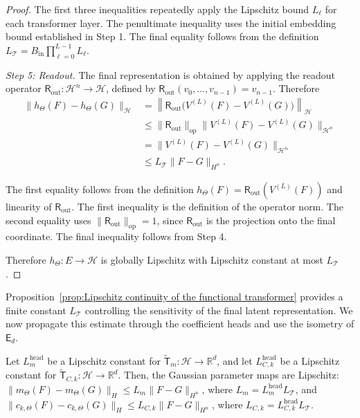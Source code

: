\begin{proof}
The first three inequalities repeatedly apply the Lipschitz bound \(L_\ell\) for each transformer layer. The penultimate inequality uses the initial embedding bound established in Step 1. The final equality follows from the definition \(L_{\mathcal T}=B_{\mathrm{in}}\prod_{\ell=0}^{L-1}L_\ell\).

\textit{Step 5: Readout.} The final representation is obtained by applying the readout operator \(\mathsf R_{\mathrm{out}}:\mathcal H^n\to\mathcal H\), defined by \(\mathsf R_{\mathrm{out}}(v_0,\ldots,v_{n-1})=v_{n-1}\). Therefore
\[
\begin{aligned}
\|h_\Theta(F)-h_\Theta(G)\|_{\mathcal H}
&=
\left\|
\mathsf R_{\mathrm{out}}\bigl(V^{(L)}(F)-V^{(L)}(G)\bigr)
\right\|_{\mathcal H}\\
&\leqslant
\|\mathsf R_{\mathrm{out}}\|_{\mathrm{op}}
\|V^{(L)}(F)-V^{(L)}(G)\|_{\mathcal H^n}\\
&=
\|V^{(L)}(F)-V^{(L)}(G)\|_{\mathcal H^n}\\
&\leqslant
L_{\mathcal T}\|F-G\|_{H^n}.
\end{aligned}
\]

The first equality follows from the definition \(h_\Theta(F)=\mathsf R_{\mathrm{out}}(V^{(L)}(F))\) and linearity of \(\mathsf R_{\mathrm{out}}\). The first inequality is the definition of the operator norm. The second equality uses \(\|\mathsf R_{\mathrm{out}}\|_{\mathrm{op}}=1\), since \(\mathsf R_{\mathrm{out}}\) is the projection onto the final coordinate. The final inequality follows from Step 4.

Therefore \(h_\Theta:E\to\mathcal H\) is globally Lipschitz with Lipschitz constant at most \(L_{\mathcal T}\).
\end{proof}

Proposition~\ref{prop:Lipschitz continuity of the functional transformer} provides a finite constant \(L_{\mathcal T}\) controlling the sensitivity of the final latent representation. We now propagate this estimate through the coefficient heads and use the isometry of \(\mathsf E_d\).

\begin{corollary}
\label{cor:Lipschitz continuity of the Gaussian parameter maps}
Let \(L_m^{\mathrm{head}}\) be a Lipschitz constant for
\(\widetilde{\mathsf T}_m:\mathcal H\to\mathbb R^d\), and let
\(L_{C,k}^{\mathrm{head}}\) be a Lipschitz constant for
\(\widetilde{\mathsf T}_{C,k}:\mathcal H\to\mathbb R^d\).
Then, the Gaussian parameter maps are Lipschitz:
\(\|m_\Theta(F)-m_\Theta(G)\|_H
\leq L_m\|F-G\|_{H^n}\),
where \(L_m=L_m^{\mathrm{head}}L_{\mathcal T}\), and
\(\|c_{k,\Theta}(F)-c_{k,\Theta}(G)\|_H
\leq L_{C,k}\|F-G\|_{H^n}\),
where \(L_{C,k}=L_{C,k}^{\mathrm{head}}L_{\mathcal T}\).
\end{corollary}


